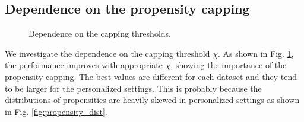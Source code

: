 \documentclass[manuscript,screen]{acmart}
\begin{document}
\subsection{Dependence on the propensity capping}
\label{subsec:sensitivity_hyperparameters}
\begin{figure}[htbp]
	\begin{center}
		\caption{Dependence on the capping thresholds.}
		\label{fig:capping}
	\end{center}
\end{figure}

We investigate the dependence on the capping threshold $\chi$.
As shown in Fig. \ref{fig:capping}, the performance improves with appropriate $\chi$, showing the importance of the propensity capping.
The best values are different for each dataset and they tend to be larger for the personalized settings.
This is probably because the distributions of propensities are heavily skewed in personalized settings as shown in Fig. \ref{fig:propensity_dist}.
\end{document}
